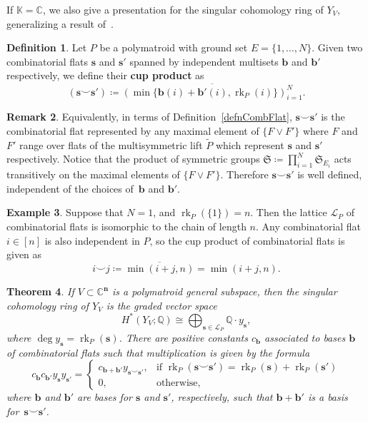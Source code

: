 \documentclass[11pt]{article}
\newtheorem{theo}{Theorem}[section]
\theoremstyle{definition}
\newtheorem{defi}[theo]{Definition}
\newtheorem{exam}[theo]{Example}
\newtheorem{rema}[theo]{Remark}
\numberwithin{equation}{section}
\newcommand{\C}{\mathbb{C}}
\newcommand{\Q}{\mathbb{Q}}
\newcommand{\K}{\mathbb{K}}
\DeclareMathOperator{\rk}{rk}
\newcommand{\revision}[1]{{#1}}
\begin{document}
If $\K = \C$, we also give a presentation for the singular cohomology ring of $Y_V$, generalizing a result of~\cite{HW17}.

\revision{\begin{defi}
    Let $P$ be a polymatroid with ground set $E=\{1, \ldots, N\}$. Given two combinatorial flats $\mathbf{s}$ and $\mathbf{s'}$ spanned by independent multisets $\mathbf{b}$ and $\mathbf{b'}$ respectively, we define their \textbf{cup product} as
    \[
    (\mathbf{s}\smile\mathbf{s'})\coloneqq\overline{\left(\min\{\mathbf{b}(i)+\mathbf{b'}(i), \rk_P(i)\}\right)_{i=1}^N}.
    \]
\end{defi}
\begin{rema}
    Equivalently, in terms of Definition~\ref{defnCombFlat}, $\mathbf{s}\smile\mathbf{s'}$ is the combinatorial flat represented by any maximal element of $\{F \vee F'\}$ where $F$ and $F'$ range over flats of the multisymmetric lift $\widetilde{P}$ which represent $\mathbf{s}$ and $\mathbf{s'}$ respectively. Notice that the product of symmetric groups $\mathfrak S \coloneqq \prod_{i=1}^N \mathfrak S_{E_i}$ acts transitively on the maximal elements of $\{F \vee F'\}$. Therefore $\mathbf{s}\smile\mathbf{s'}$ is well defined, independent of the choices of~$\mathbf{b}$ and $\mathbf{b'}$.
\end{rema}
}
    
\revision{\begin{exam}
    Suppose that $N=1$, and $\rk_P(\{1\}) = n$. Then the lattice $\mathcal L_P$ of combinatorial flats is isomorphic to the chain of length $n$. Any combinatorial flat $i \in [n]$ is also independent in $P$, so the cup product of combinatorial flats is given as
    \[
        i \smile j \coloneqq \overline{\min(i+j, n)} = \min(i+j,n).
    \]
\end{exam}}

\begin{theo}\label{cohomology2}
  If $V \subset \C^{\mathbf n}$ is a polymatroid general subspace, then the
  singular cohomology ring of $Y_V$ is the graded vector space
  \[ H^*(Y_V; \Q) \cong \bigoplus_{\mathbf s \in \mathcal L_{P}} \Q \cdot y_{\mathbf s},
  \]
  where $\deg y_{\mathbf s} = \rk_P(\mathbf s)$. There are \revision{positive} constants $c_{\mathbf b}$ associated to bases $\mathbf b$ of combinatorial flats such that  multiplication is given by the formula
  \[
    c_{\mathbf b} c_{\mathbf b'} y_{\mathbf s} y_{\mathbf s'} = \begin{cases}
                                     c_{\mathbf b + \mathbf b'} y_{\mathbf s \smile \mathbf s'}, & \text{if $\rk_P(\mathbf s \smile \mathbf s') = \rk_P(\mathbf s) + \rk_P(\mathbf s')$} \\
     0, & \text{otherwise,}                                
    \end{cases}
  \]
  where $\mathbf b$ and $\mathbf b'$ are bases for $\mathbf s$ and $\mathbf s'$, respectively, such that $\mathbf b + \mathbf b'$ is a basis for~$\mathbf s \smile \mathbf s'$.
\end{theo}
\end{document}
